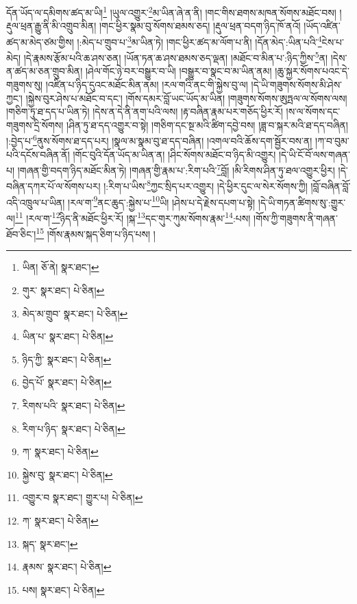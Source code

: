 དོན་ཡོད་ལ་དམིགས་ཚད་མ་ཡི།\footnote{ཡིན།  ཅོ་ནེ།  སྣར་ཐང་། } །ཡུལ་འགྱུར་\footnote{གུར་  སྣར་ཐང་།  པེ་ཅིན། }མ་ཡིན་ཞེ་ན་ནི། །གང་གིས་ཐགས་མཁན་སོགས་མཐོང་བས། །རྡུལ་ཕྲན་རྒྱུ་ནི་མི་འགྲུབ་མིན། །གང་ཕྱིར་སྣམ་བུ་སོགས་ཐམས་ཅད། །རྡུལ་ཕྲན་བདག་ཉིད་ཁོ་ནའོ། །ཡོད་འཛིན་ཚད་མ་མེད་ཙམ་གྱིས། །:མེད་པ་གྲུབ་པ་\footnote{མེད་མ་གྲུབ་  སྣར་ཐང་།  པེ་ཅིན། }མ་ཡིན་ཏེ། །གང་ཕྱིར་ཚད་མ་ལོག་པ་ནི། །དོན་མེད་:ཡིན་པའི་\footnote{ཡིན་པ་  སྣར་ཐང་།  པེ་ཅིན། }ངེས་པ་མེད། །དེ་རྣམས་རྩོམ་པའི་ཆ་ཤས་ཅན། །ཡོན་ཏན་ཆ་ཤས་ཐམས་ཅད་ལྡན། །མཐོང་བ་མིན་པ་:ཉིད་ཀྱིས་\footnote{ཉིད་ཀྱི་  སྣར་ཐང་།  པེ་ཅིན། }ན། །དེས་ན་ཚད་མ་ཅན་གྲུབ་མིན། །ཤེལ་གོང་ཉེ་བར་བསྒྱུར་བ་ཡི། །བསྒྱུར་བ་སྣང་བ་མ་ཡིན་ནམ། །ཆུ་སྐྱར་སོགས་པའང་དེ་གཟུགས་སུ། །འཛིན་པ་ཉིད་དུའང་མཐོང་མིན་ནམ། །རལ་གའི་ནང་གི་སྐྱེས་བུ་ལ། །དེ་ཡི་གཟུགས་སོགས་མི་ཤེས་ཀྱང་། །སྐྱེས་བུར་ཤེས་པ་མཐོང་བ་དང་། །གོས་དམར་བློ་ཡང་ཡོད་མ་ཡིན། །གཟུགས་སོགས་ཨུཏྤལ་ལ་སོགས་ལས། །གཅིག་ཏུ་ཐ་དད་པ་ཡིན་ཏེ། །དེས་ན་དེ་ནི་ནག་པའི་ལས། །རྟ་བཞིན་རྣམ་པར་གཅོད་ཕྱིར་རོ། །ས་ལ་སོགས་དང་གཟུགས་དྲི་སོགས། །ཤིན་ཏུ་ཐ་དད་འགྱུར་བ་སྟེ། །གཅིག་དང་སྔ་མའི་ཚིག་དབྱེ་བས། །ཟླ་བ་སྐར་མའི་ཐ་དད་བཞིན། །:བྱེད་པ་\footnote{བྱེད་པོ་  སྣར་ཐང་།  པེ་ཅིན། }ནུས་སོགས་ཐ་དད་པར། །སྣལ་མ་སྣམ་བུ་ཐ་དད་བཞིན། །འགལ་བའི་ཆོས་དག་སྦྱོར་བས་ན། །ཀ་བ་བུམ་པའི་དངོས་བཞིན་ནོ། །གོང་བུའི་དོན་ཡོད་མ་ཡིན་ན། །ཤིང་སོགས་མཐོང་བ་ཉིད་མི་འགྱུར། །དེ་ཡི་ངོ་བོ་ལས་གཞན་པ། །གཞན་གྱི་བདག་ཉིད་མཐོང་མིན་ཏེ། །གཞན་གྱི་རྣམ་པ་:རིག་པའི་\footnote{རིགས་པའི་  སྣར་ཐང་།  པེ་ཅིན། }བློ། །མི་རིགས་ཤིན་ཏུ་ཐལ་འགྱུར་ཕྱིར། །དེ་བཞིན་དཀར་པོ་ལ་སོགས་པར། །:རིག་པ་ཡིས་\footnote{རིག་པ་ཉིད་  སྣར་ཐང་།  པེ་ཅིན། }ཀྱང་སྲིད་པར་འགྱུར། །དེ་ཕྱིར་དུང་ལ་སེར་སོགས་ཀྱི། །བློ་བཞིན་བློ་འདི་འཁྲུལ་པ་ཡིན། །རལ་ག་\footnote{ཀ་  སྣར་ཐང་།  པེ་ཅིན། }ནང་ཆུད་:སྐྱེས་པ་\footnote{སྐྱེས་བུ་  སྣར་ཐང་།  པེ་ཅིན། }ཡི། །ཤེས་པ་དེ་རྗེས་དཔག་པ་སྟེ། །དེ་ཡི་གཏན་ཚིགས་སུ་:གྱུར་ལ།\footnote{འགྱུར་བ  སྣར་ཐང་། གྱུར་པ།  པེ་ཅིན། } །རལ་ག་\footnote{ཀ་  སྣར་ཐང་།  པེ་ཅིན། }ཉིད་ནི་མཐོང་ཕྱིར་རོ། །སྐ་\footnote{སྐད་  སྣར་ཐང་། }དང་གུར་ཀུམ་སོགས་རྣམ་\footnote{རྣམས་  སྣར་ཐང་།  པེ་ཅིན། }:པས། །གོས་ཀྱི་གཟུགས་ནི་གཞན་ཐོབ་ཅིང་།\footnote{པས།  སྣར་ཐང་།  པེ་ཅིན། } །གོས་རྣམས་སྐད་ཅིག་པ་ཉིད་པས། །
